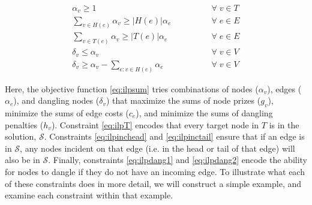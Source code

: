 \documentclass[12pt,twoside]{reedthesis}
\theoremstyle{definition}
\begin{document}
\begin{align}
 \alpha_v \geq 1 \qquad\qquad &\forall\; v \in T\label{eq:ilpT}\\
 \sum_{v \in H(e)} \alpha_v \geq \lvert H(e)\rvert \alpha_e \qquad\qquad &\forall\; e \in E\label{eq:ilpinchead}\\
 \sum_{v \in T(e)} \alpha_v \geq \lvert T(e)\rvert \alpha_e\qquad\qquad &\forall\; e \in E\label{eq:ilpinctail}\\
 \delta_v \leq \alpha_v \qquad\qquad &\forall\; v \in V\label{eq:ilpdang1}\\
 \delta_v \geq \alpha_{v} - \sum_{e:v \in H(e)} \alpha_e \qquad\qquad &\forall\; v \in V\label{eq:ilpdang2}%
\end{align}%


Here, the objective function \eqref{eq:ilpsum} tries combinations of nodes ($\alpha_v$), edges ($\alpha_e$), and dangling nodes ($\delta_v$) that maximize the sums of node prizes ($g_v$), minimize the sums of edge costs ($c_e$), and minimize the sums of dangling penalties ($h_v$). Constraint \eqref{eq:ilpT} encodes that every target node in $T$ is in the solution, $\mathcal{S}$.  Constraints \eqref{eq:ilpinchead} and \eqref{eq:ilpinctail} ensure that if an edge is in $\mathcal{S}$, any nodes incident on that edge (i.e. in the head or tail of that edge) will also be in $\mathcal{S}$.  Finally, constraints \eqref{eq:ilpdang1} and \eqref{eq:ilpdang2} encode the ability for nodes to dangle if they do not have an incoming edge. To illustrate what each of these constraints does in more detail, we will construct a simple example, and examine each constraint within that example.\par
\end{document}
